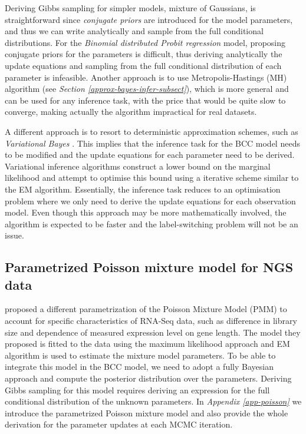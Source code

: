 Deriving Gibbs sampling for simpler models, \eg mixture of Gaussians, is straightforward since \emph{conjugate priors} are introduced for the model parameters, and thus we can write analytically and sample from the full conditional distributions. For the \emph{Binomial distributed Probit regression} model, proposing conjugate priors for the parameters is difficult, thus deriving analytically the update equations and sampling from the full conditional distribution of each parameter is infeasible. Another approach is to use Metropolis-Hastings (MH) algorithm (see \emph{Section \ref{approx-bayes-infer-subsect}}), which is more general and can be used for any inference task, with the price that would be quite slow to converge, making actually the algorithm impractical for real datasets. 

A different approach is to resort to deterministic approximation schemes, such as \emph{Variational Bayes} \citep{Beal2003}. This implies that the inference task for the BCC model needs to be modified and the update equations for each parameter need to be derived. Variational inference algorithms construct a lower bound on the marginal likelihood and attempt to optimise this bound using a iterative scheme similar to the EM algorithm. Essentially, the inference task reduces to an optimisation problem where we only need to derive the update equations for each observation model. Even though this approach may be more mathematically involved, the algorithm is expected to be faster and the label-switching problem \citep{Stephens2000} will not be an issue.


\subsection{Parametrized Poisson mixture model for NGS data}
\citet{Rau2013} proposed a different parametrization of the Poisson Mixture Model (PMM) to account for specific characteristics of RNA-Seq data, such as difference in library size and dependence of measured expression level on gene length. The model they proposed is fitted to the data using the maximum likelihood approach and EM algorithm is used to estimate the mixture model parameters. To be able to integrate this model in the BCC model, we need to adopt a fully Bayesian approach and compute the posterior distribution over the parameters. Deriving Gibbs sampling for this model requires deriving an expression for the full conditional distribution of the unknown parameters. In \emph{Appendix \ref{app-poisson}} we introduce the parametrized Poisson mixture model and also provide the whole derivation for the parameter updates at each MCMC iteration.

